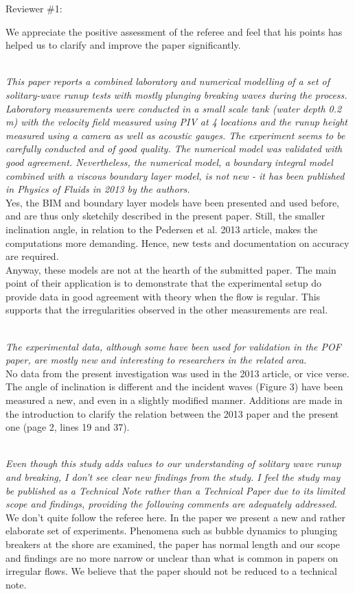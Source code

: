 \documentclass[11pt]{article}
\begin{document}
\newcommand{\refpoint}[1]{\ \vspace{0.3cm}\\ {\em #1}\  \vspace{0.3cm}\\ }
\newcommand{\todo}[1]{\ \\ {\bf To do: #1}}
Reviewer \#1: 

We appreciate the positive assessment of the referee and feel that his points has helped us to clarify and improve the paper significantly.

\refpoint{This paper reports a combined laboratory and numerical modelling of a set of solitary-wave runup tests 
with mostly plunging breaking waves during the process.  Laboratory measurements were conducted in a small scale tank 
(water depth 0.2 m) with the velocity field measured using PIV at 4 locations and the runup height measured using a 
camera as well as acoustic gauges.  The experiment seems to be carefully conducted and of good quality.  The numerical
 model was validated with good agreement.  Nevertheless, the numerical model, a boundary integral model combined with a
 viscous boundary layer model, is not new - it has been published in Physics of Fluids in 2013 by the authors.}
Yes, the BIM and boundary layer models have been presented and used before, and are thus only sketchily described 
in the present paper. Still, the smaller inclination angle, in relation to the Pedersen et al. 2013 article, makes the 
computations more demanding. Hence, new tests and documentation on accuracy are required.\\
Anyway, these models are not at the hearth of the submitted paper.
The main point of their application  is to demonstrate that the experimental setup do
provide data in good agreement with theory when the flow is regular. This supports that the irregularities
observed in the other measurements are real.   

 \refpoint{The 
experimental data, although some have been used for validation in the POF paper, are mostly new and interesting to 
researchers in the related area.}
No data from the present investigation was used in the 2013 article, or vice verse. The angle of inclination
is different and the incident waves (Figure 3) have been measured a new, and even in a slightly modified manner. 
Additions are made in the introduction to clarify the relation between the 2013 paper and the present one (page 2, lines 19 and 37).

\refpoint{ Even though this study adds values to our understanding of solitary wave runup and 
breaking, I don't see clear new findings from the study.
 I feel the study may be published as a Technical Note rather than a Technical Paper due to its limited scope and 
findings, providing the following comments are adequately addressed.}
We don't quite follow the referee here. In the paper we present a new and rather elaborate set of experiments.
Phenomena such as bubble dynamics to plunging breakers at the shore are examined, 
the paper has normal length and our scope and findings are no more narrow or unclear than what is common in 
papers on irregular flows.
We believe that the paper should not be reduced to a technical note. 
\end{document}
